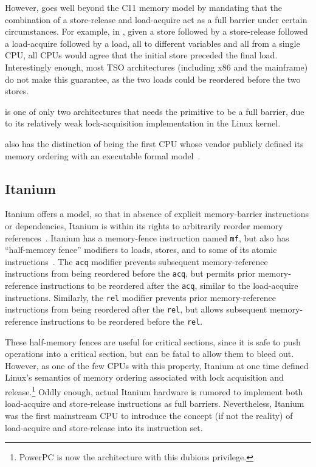 However,  goes well beyond the C11 memory model by mandating that
the combination of a store-release and load-acquire act as a full
barrier under certain circumstances.
For example, in , given a store followed by a store-release followed
a load-acquire followed by a load, all to different variables and all from
a single CPU, all CPUs
would agree that the initial store preceded the final load.
Interestingly enough, most TSO architectures (including x86 and the
mainframe) do not make this guarantee, as the two loads could be
reordered before the two stores.

 is one of only two architectures that needs the
 primitive to be a full barrier,
due to its relatively weak lock-acquisition implementation in
the Linux kernel.

 also has the distinction of being the first CPU whose vendor publicly
defined its memory ordering with an executable formal model~\cite{ARMv8A:2017}.

\subsection{Itanium}
\label{sec:memorder:Itanium}

Itanium offers a 
model, so that in absence of explicit
memory-barrier instructions or dependencies, Itanium is within its rights
to arbitrarily reorder memory references~\cite{IntelItanium02v2}.
Itanium has a memory-fence instruction named {\tt mf}, but also has
``half-memory fence'' modifiers to loads, stores, and to some of its atomic
instructions~\cite{IntelItanium02v3}.
The {\tt acq} modifier prevents subsequent memory-reference instructions
from being reordered before the {\tt acq}, but permits
prior memory-reference instructions to be reordered after the {\tt acq},
similar to the  load-acquire instructions.
Similarly, the {\tt rel} modifier prevents prior memory-reference
instructions from being reordered after the {\tt rel}, but allows
subsequent memory-reference instructions to be reordered before
the {\tt rel}.

These half-memory fences are useful for critical sections, since
it is safe to push operations into a critical section, but can be
fatal to allow them to bleed out.
However, as one of the few CPUs with this property, Itanium at one
time defined Linux's semantics of memory ordering associated with lock
acquisition and release.\footnote{
	PowerPC is now the architecture with this dubious privilege.}
Oddly enough, actual Itanium hardware is rumored to implement
both load-acquire and store-release instructions as full barriers.
Nevertheless, Itanium was the first mainstream CPU to introduce the concept
(if not the reality) of load-acquire and store-release into its
instruction set.

